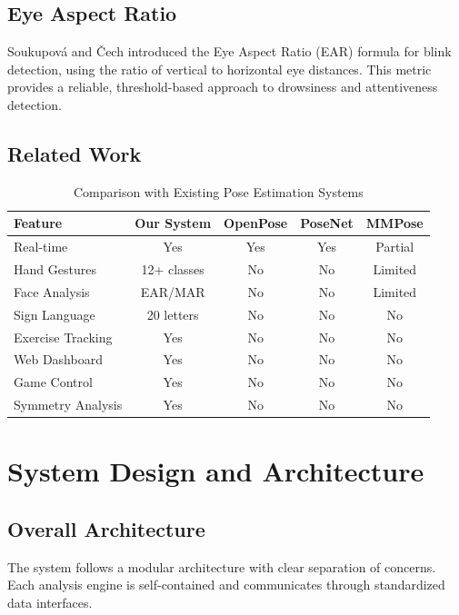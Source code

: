 \documentclass[a4paper,12pt]{report}
\begin{document}
\section{Eye Aspect Ratio}
Soukupov\'{a} and \v{C}ech \cite{ear2016} introduced the Eye Aspect Ratio (EAR) formula for blink detection, using the ratio of vertical to horizontal eye distances. This metric provides a reliable, threshold-based approach to drowsiness and attentiveness detection.

\section{Related Work}
\begin{table}[H]
\centering
\begin{tabular}{|l|c|c|c|c|}
\hline
\textbf{Feature} & \textbf{Our System} & \textbf{OpenPose} & \textbf{PoseNet} & \textbf{MMPose} \\
\hline
Real-time & Yes & Yes & Yes & Partial \\
Hand Gestures & 12+ classes & No & No & Limited \\
Face Analysis & EAR/MAR & No & No & Limited \\
Sign Language & 20 letters & No & No & No \\
Exercise Tracking & Yes & No & No & No \\
Web Dashboard & Yes & No & No & No \\
Game Control & Yes & No & No & No \\
Symmetry Analysis & Yes & No & No & No \\
\hline
\end{tabular}
\caption{Comparison with Existing Pose Estimation Systems}
\label{tab:comparison}
\end{table}

\newpage

\chapter{System Design and Architecture}
\thispagestyle{contentpages}
\justifying

\section{Overall Architecture}
The system follows a modular architecture with clear separation of concerns. Each analysis engine is self-contained and communicates through standardized data interfaces.
\end{document}
